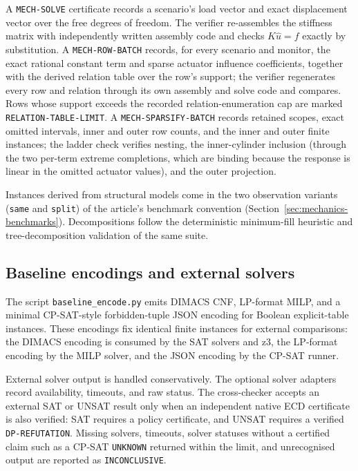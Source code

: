 A \texttt{MECH-SOLVE} certificate records a scenario's load vector and exact
displacement vector over the free degrees of freedom. The verifier re-assembles
the stiffness matrix with independently written assembly code and checks
$K\widehat u = f$ exactly by substitution. A \texttt{MECH-ROW-BATCH} records,
for every scenario and monitor, the exact rational constant term and sparse
actuator influence coefficients, together with the derived relation table over
the row's support; the verifier regenerates every row and relation through its
own assembly and solve code and compares. Rows whose support exceeds the
recorded relation-enumeration cap are marked
\texttt{RELATION-TABLE-LIMIT}. A \texttt{MECH-SPARSIFY-BATCH} records retained
scopes, exact omitted intervals, inner and outer row counts, and the inner and
outer finite instances; the ladder check verifies nesting, the inner-cylinder
inclusion (through the two per-term extreme completions, which are binding
because the response is linear in the omitted actuator values), and the outer
projection.

Instances derived from structural models come in the two observation variants
(\texttt{same} and \texttt{split}) of the article's benchmark convention
(Section~\ref{sec:mechanics-benchmarks}). Decompositions follow the
deterministic minimum-fill heuristic and tree-decomposition validation of the
same suite.

\subsection{Baseline encodings and external solvers}

The script \texttt{baseline\_encode.py} emits DIMACS CNF, LP-format MILP, and a
minimal CP-SAT-style forbidden-tuple JSON encoding for Boolean explicit-table
instances. These encodings fix identical finite instances for external
comparisons: the DIMACS encoding is consumed by the SAT solvers and z3, the
LP-format encoding by the MILP solver, and the JSON encoding by the CP-SAT
runner.

External solver output is handled conservatively. The optional solver adapters
record availability, timeouts, and raw status. The cross-checker accepts an
external SAT or UNSAT result only when an independent native ECD certificate is
also verified: SAT requires a policy certificate, and UNSAT requires a verified
\texttt{DP-REFUTATION}. Missing solvers, timeouts, solver statuses without a
certified claim such as a CP-SAT \texttt{UNKNOWN} returned within the limit, and
unrecognised output are
reported as \texttt{INCONCLUSIVE}.

